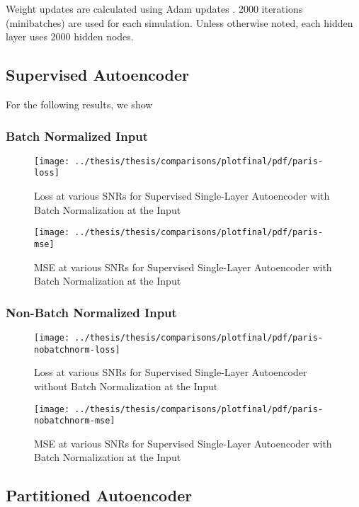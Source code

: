 Weight updates are calculated using Adam updates \cite{DBLP:journals/corr/KingmaB14}. 2000 iterations (minibatches) are used for each simulation. Unless otherwise noted, each hidden layer uses 2000 hidden nodes.

\subsection{Supervised Autoencoder}

For the following results, we show

\subsubsection{Batch Normalized Input}

\begin{figure}[!ht]
\centering
\texttt{[image: ../thesis/thesis/comparisons/plotfinal/pdf/paris-loss]}
\caption{Loss at various SNRs for Supervised Single-Layer Autoencoder with Batch Normalization at the Input}
\end{figure}

\begin{figure}[!ht]
\centering
\texttt{[image: ../thesis/thesis/comparisons/plotfinal/pdf/paris-mse]}
\caption{MSE at various SNRs for Supervised Single-Layer Autoencoder with Batch Normalization at the Input}
\end{figure}

\subsubsection{Non-Batch Normalized Input}

\begin{figure}[!ht]
\centering
\texttt{[image: ../thesis/thesis/comparisons/plotfinal/pdf/paris-nobatchnorm-loss]}
\caption{Loss at various SNRs for Supervised Single-Layer Autoencoder without Batch Normalization at the Input}
\end{figure}

\begin{figure}[!ht]
\centering
\texttt{[image: ../thesis/thesis/comparisons/plotfinal/pdf/paris-nobatchnorm-mse]}
\caption{MSE at various SNRs for Supervised Single-Layer Autoencoder with Batch Normalization at the Input}
\end{figure}


\subsection{Partitioned Autoencoder}

